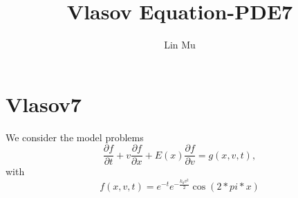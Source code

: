 \documentclass[a4paper,10pt]{article}
\title{Vlasov Equation-PDE7}
\author{Lin Mu}
\numberwithin{equation}{section}
\begin{document}
\maketitle


\section{Vlasov7}
We consider the model problems
\begin{equation}
\frac{\partial f}{\partial t}+v\frac{\partial f}{\partial x}+E(x)\frac{\partial f}{\partial v}=g(x,v,t),
\end{equation}
with 
$$f(x,v,t)=e^{-t}e^{-\frac{k_0v^2}{2}}\cos(2*pi*x)$$
\end{document}
